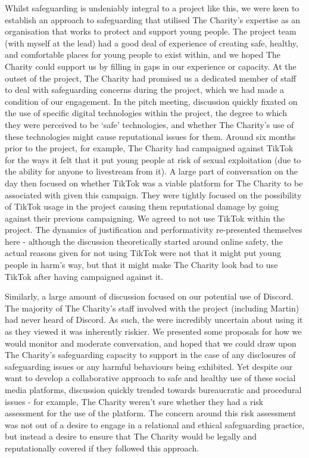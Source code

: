 Whilst safeguarding is undeniably integral to a project like this, we were keen to establish an approach to safeguarding that utilised The Charity's expertise as an organisation that works to protect and support young people. The project team (with myself at the lead) had a good deal of experience of creating safe, healthy, and comfortable places for young people to exist within, and we hoped The Charity could support us by filling in gaps in our experience or capacity.  At the outset of the project, The Charity had promised us a dedicated member of staff to deal with safeguarding concerns during the project, which we had made a condition of our engagement. In the pitch meeting, discussion quickly fixated on the use of specific digital technologies within the project, the degree to which they were perceived to be ‘safe’ technologies, and whether The Charity's use of these technologies might cause reputational issues for them. Around six months prior to the project, for example, The Charity had campaigned against TikTok for the ways it felt that it put young people at risk of sexual exploitation (due to the ability for anyone to livestream from it). A large part of conversation on the day then focused on whether TikTok was a viable platform for The Charity to be associated with given this campaign. They were tightly focused on the possibility of TikTok usage in the project causing them reputational damage by going against their previous campaigning. We agreed to not use TikTok within the project. The dynamics of justification and performativity re-presented themselves here - although the discussion theoretically started around online safety, the actual reasons given for not using TikTok were not that it might put young people in harm's way, but that it might make The Charity look bad to use TikTok after having campaigned against it. 

Similarly, a large amount of discussion focused on our potential use of Discord. The majority of The Charity's staff involved with the project (including Martin) had never heard of Discord. As such, the were incredibly uncertain about using it as they viewed it was inherently riskier. We presented some proposals for how we would monitor and moderate conversation, and hoped that we could draw upon The Charity's safeguarding capacity to support in the case of any disclosures of safeguarding issues or any harmful behaviours being exhibited. Yet despite our want to develop a collaborative approach to safe and healthy use of these social media platforms, discussion quickly trended towards bureaucratic and procedural issues - for example, The Charity weren't sure whether they had a risk assessment for the use of the platform. The concern around this risk assessment was not out of a desire to engage in a relational and ethical safeguarding practice, but instead a desire to ensure that The Charity would be legally and reputationally covered if they followed this approach.

